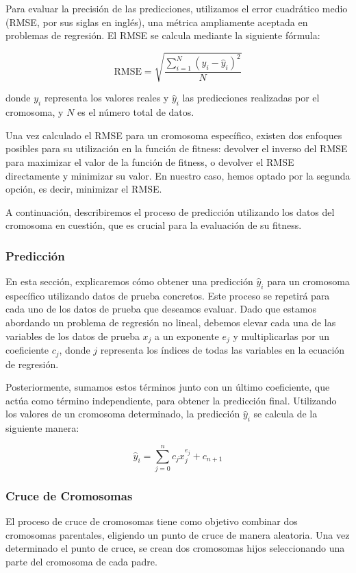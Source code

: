 \documentclass[conference,a4paper]{IEEEtran}
\begin{document}
Para evaluar la precisión de las predicciones, utilizamos el error cuadrático medio (RMSE, por sus siglas en inglés), una métrica ampliamente aceptada en problemas de regresión. El RMSE se calcula mediante la siguiente fórmula:

\[
\text{RMSE} = \sqrt{\frac{\sum_{i=1}^{N} (y_i - \hat{y}_i)^2}{N}}
\]

donde \( y_i \) representa los valores reales y \( \hat{y}_i \) las predicciones realizadas por el cromosoma, y \( N \) es el número total de datos.

Una vez calculado el RMSE para un cromosoma específico, existen dos enfoques posibles para su utilización en la función de fitness: devolver el inverso del RMSE para maximizar el valor de la función de fitness, o devolver el RMSE directamente y minimizar su valor. En nuestro caso, hemos optado por la segunda opción, es decir, minimizar el RMSE.

A continuación, describiremos el proceso de predicción utilizando los datos del cromosoma en cuestión, que es crucial para la evaluación de su fitness.

\subsubsection{Predicción}
En esta sección, explicaremos cómo obtener una predicción \(\hat{y}_i\) para un cromosoma específico utilizando datos de prueba concretos. Este proceso se repetirá para cada uno de los datos de prueba que deseamos evaluar. Dado que estamos abordando un problema de regresión no lineal, debemos elevar cada una de las variables de los datos de prueba \(x_j\) a un exponente \(e_j\) y multiplicarlas por un coeficiente \(c_j\), donde \(j\) representa los índices de todas las variables en la ecuación de regresión. 

Posteriormente, sumamos estos términos junto con un último coeficiente, que actúa como término independiente, para obtener la predicción final. Utilizando los valores de un cromosoma determinado, la predicción \(\hat{y}_i\) se calcula de la siguiente manera:

\[
\hat{y}_i = \sum_{j=0}^{n} c_j x_j^{e_j} + c_{n+1}
\]


\subsubsection{Cruce de Cromosomas}
El proceso de cruce de cromosomas tiene como objetivo combinar dos cromosomas parentales, eligiendo un punto de cruce de manera aleatoria. Una vez determinado el punto de cruce, se crean dos cromosomas hijos seleccionando una parte del cromosoma de cada padre. 
\end{document}
